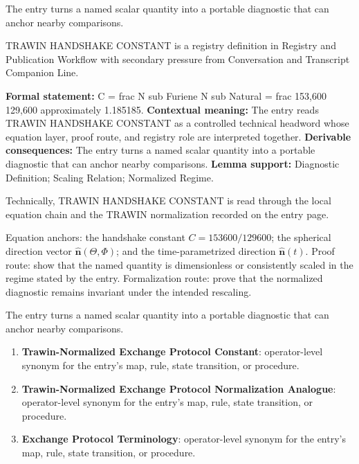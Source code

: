 The entry turns a named scalar quantity into a portable diagnostic that can anchor nearby comparisons.
\clearpage


\begingroup\small
{}
TRAWIN HANDSHAKE CONSTANT is a registry definition in Registry and Publication Workflow with secondary pressure from Conversation and Transcript Companion Line.

\begingroup\footnotesize\setlength{\emergencystretch}{3em}\sloppy
\textbf{Formal statement:} C = frac N sub Furiene N sub Natural = frac 153,600 129,600 approximately 1.185185. \textbf{Contextual meaning:} The entry reads TRAWIN HANDSHAKE CONSTANT as a controlled technical headword whose equation layer, proof route, and registry role are interpreted together. \textbf{Derivable consequences:} The entry turns a named scalar quantity into a portable diagnostic that can anchor nearby comparisons. \textbf{Lemma support:} Diagnostic Definition; Scaling Relation; Normalized Regime.\par
\endgroup

Technically, TRAWIN HANDSHAKE CONSTANT is read through the local equation chain and the TRAWIN normalization recorded on the entry page.

Equation anchors: the handshake constant \(C=153600/129600\); the spherical direction vector \(\widehat{\mathbf{n}}(\Theta,\Phi)\); and the time-parametrized direction \(\widehat{\mathbf{n}}(t)\). Proof route: show that the named quantity is dimensionless or consistently scaled in the regime stated by the entry. Formalization route: prove that the normalized diagnostic remains invariant under the intended rescaling.

The entry turns a named scalar quantity into a portable diagnostic that can anchor nearby comparisons.
\endgroup

\begin{enumerate}[leftmargin=1.6em,itemsep=6pt,topsep=4pt]
\item \textbf{Trawin-Normalized Exchange Protocol Constant}: operator-level synonym for the entry's map, rule, state transition, or procedure.
\item \textbf{Trawin-Normalized Exchange Protocol Normalization Analogue}: operator-level synonym for the entry's map, rule, state transition, or procedure.
\item \textbf{Exchange Protocol Terminology}: operator-level synonym for the entry's map, rule, state transition, or procedure.
\end{enumerate}

